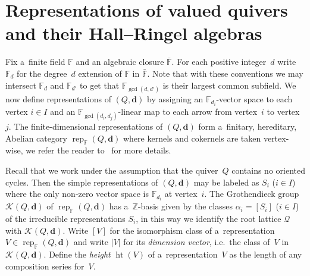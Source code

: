 \documentclass[11pt]{article}
\numberwithin{equation}{section}
\begin{document}
\section{Representations of valued quivers\\ and their Hall--Ringel
algebras}\label{sec:valued quivers}

Fix a~f\/inite f\/ield $\mathbb{F}$ and an algebraic closure $\bar{\mathbb{F}}$.
For each positive integer~$d$ write $\mathbb{F}_d$ for the degree~$d$ extension of $\mathbb{F}$ in $\bar{\mathbb{F}}$.
Note that with these conventions we may intersect $\mathbb{F}_d$ and $\mathbb{F}_{d'}$ to get that
$\mathbb{F}_{\gcd(d,d')}$ is their largest common subf\/ield.
We now def\/ine representations of $(Q,\mathbf{d})$ by assigning an $\mathbb{F}_{d_i}$-vector space to each vertex $i\in
I$ and an $\mathbb{F}_{\gcd(d_i,d_j)}$-linear map to each arrow from vertex~$i$ to vertex~$j$.
The f\/inite-dimensional representations of $(Q,\mathbf{d})$ form a~f\/initary, hereditary, Abelian category
$\operatorname{rep}_\mathbb{F}(Q,\mathbf{d})$ where kernels and cokernels are taken vertex-wise, we refer the reader  %
to~\cite{rupel1} for more details.

Recall that we work under the assumption that the quiver~$Q$ contains no oriented cycles.
Then the simple representations of $(Q,\mathbf{d})$ may be labeled as $S_i$ ($i\in I$) where the only non-zero vector  %
space is $\mathbb{F}_{d_i}$ at vertex~$i$.
The Grothendieck group $\mathcal{K}(Q,\mathbf{d})$ of $\operatorname{rep}_\mathbb{F}(Q,\mathbf{d})$ has
a~$\mathbb{Z}$-basis given by the classes $\alpha_i=[S_i]$ ($i\in I$) of the irreducible representations $S_i$, in this
way we identify the root lattice $\mathcal{Q}$ with $\mathcal{K}(Q,\mathbf{d})$.
Write $[V]$ for the isomorphism class of a~representation $V\in\operatorname{rep}_\mathbb{F}(Q,\mathbf{d})$ and write
$|V|$ for its \emph{dimension vector}, i.e.~the class of~$V$ in $\mathcal{K}(Q,\mathbf{d})$.
Def\/ine the \emph{height} $\operatorname{ht}(V)$ of a~representation~$V$ as the length of any composition series for~$V$.
\end{document}

